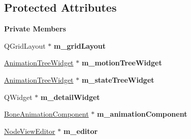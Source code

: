 \subsection*{Protected Attributes}
\begin{Indent}\textbf{ Private Members}\par
\begin{DoxyCompactItemize}
\item 
\mbox{\label{classrev_1_1_view_1_1_animation_node_widget_a2a4e6d87f63aad25261c05623babcae1}} 
Q\+Grid\+Layout $\ast$ {\bfseries m\+\_\+grid\+Layout}
\item 
\mbox{\label{classrev_1_1_view_1_1_animation_node_widget_afa8dc3de7fa60d04d036999d0e5565b3}} 
\mbox{\hyperlink{classrev_1_1_view_1_1_animation_tree_widget}{Animation\+Tree\+Widget}} $\ast$ {\bfseries m\+\_\+motion\+Tree\+Widget}
\item 
\mbox{\label{classrev_1_1_view_1_1_animation_node_widget_aabb628e24cd5998fe3371ed522b05c0c}} 
\mbox{\hyperlink{classrev_1_1_view_1_1_animation_tree_widget}{Animation\+Tree\+Widget}} $\ast$ {\bfseries m\+\_\+state\+Tree\+Widget}
\item 
\mbox{\label{classrev_1_1_view_1_1_animation_node_widget_a4ce50db278eb2c5b799465d358fb7ec3}} 
Q\+Widget $\ast$ {\bfseries m\+\_\+detail\+Widget}
\item 
\mbox{\label{classrev_1_1_view_1_1_animation_node_widget_af7e61c2f1ec2538a00c5927101da298f}} 
\mbox{\hyperlink{classrev_1_1_bone_animation_component}{Bone\+Animation\+Component}} $\ast$ {\bfseries m\+\_\+animation\+Component}
\item 
\mbox{\label{classrev_1_1_view_1_1_animation_node_widget_ad986a1422262c7b262988220d14878d5}} 
\mbox{\hyperlink{classrev_1_1_view_1_1_node_view_editor}{Node\+View\+Editor}} $\ast$ {\bfseries m\+\_\+editor}
\item 
\mbox{\label{classrev_1_1_view_1_1_animation_node_widget_af694240cdbec30217c460bc97cc50ebf}} 

\end{DoxyCompactItemize}
\end{Indent}
